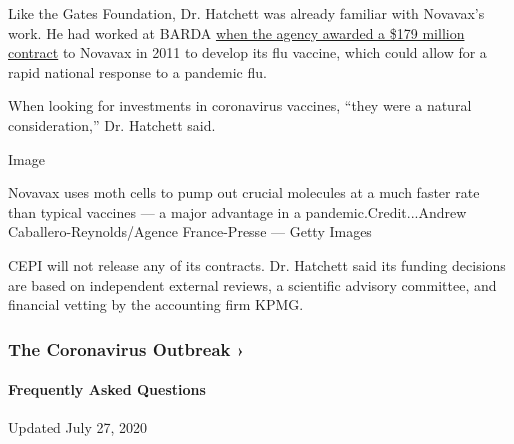 Like the Gates Foundation, Dr. Hatchett was already familiar with
Novavax's work. He had worked at BARDA
\href{https://www.prnewswire.com/news-releases/novavax-awarded-hhs-barda-contract-valued-at-up-to-179-million-to-develop-pandemic-and-seasonal-influenza-vaccines-for-us-government-using-recombinant-vlp-technology-117145058.html}{when
the agency awarded a \$179 million contract} to Novavax in 2011 to
develop its flu vaccine, which could allow for a rapid national response
to a pandemic flu.

When looking for investments in coronavirus vaccines, ``they were a
natural consideration,'' Dr. Hatchett said.

Image

Novavax uses moth cells to pump out crucial molecules at a much faster
rate than typical vaccines --- a major advantage in a
pandemic.Credit...Andrew Caballero-Reynolds/Agence France-Presse ---
Getty Images

CEPI will not release any of its contracts. Dr. Hatchett said its
funding decisions are based on independent external reviews, a
scientific advisory committee, and financial vetting by the accounting
firm KPMG.

\href{https://www.nytimes.com/news-event/coronavirus?action=click\&pgtype=Article\&state=default\&region=MAIN_CONTENT_3\&context=storylines_faq}{}

\hypertarget{the-coronavirus-outbreak-}{%
\subsubsection{The Coronavirus Outbreak
›}\label{the-coronavirus-outbreak-}}

\hypertarget{frequently-asked-questions}{%
\paragraph{Frequently Asked
Questions}\label{frequently-asked-questions}}

Updated July 27, 2020

